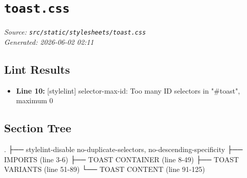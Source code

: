 
\section{\texttt{toast.css}}
\textit{Source: \texttt{src/static/stylesheets/toast.css}} \\
\textit{Generated: 2026-06-02 02:11} \\

\subsection{Lint Results}
\begin{itemize}
  \item \textbf{Line 10:} [stylelint] selector-max-id: Too many ID selectors in "\#toast", maximum 0
\end{itemize}

\subsection{Section Tree}
\begingroup
\linespread{0.9}\selectfont
\begin{verbnobox}[\FiraCode]
.
├── stylelint-disable no-duplicate-selectors, no-descending-specificity
├── IMPORTS  (line 3-6)
├── TOAST CONTAINER  (line 8-49)
├── TOAST VARIANTS  (line 51-89)
└── TOAST CONTENT  (line 91-125)
\end{verbnobox}
\endgroup
